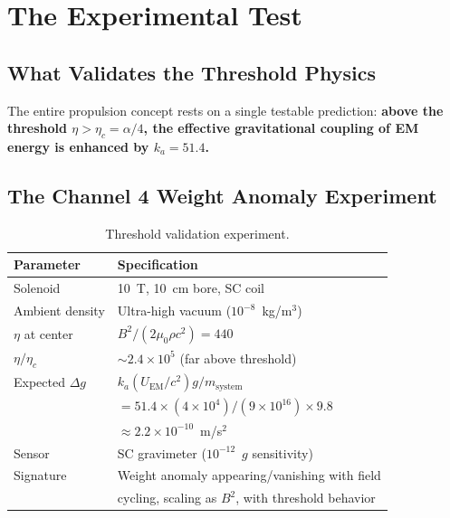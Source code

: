 \documentclass[12pt,aps,prd,superscriptaddress,nofootinbib,longbibliography]{revtex4-2}
\newcommand{\ka}{k_a}
\newcommand{\etac}{\eta_c}
\begin{document}
\section{The Experimental Test}\label{sec:experiment}

\subsection{What Validates the Threshold Physics}

The entire propulsion concept rests on a single testable prediction:
\textbf{above the threshold $\eta > \etac = \alpha/4$, the effective
gravitational coupling of EM energy is enhanced by $\ka = 51.4$.}

\subsection{The Channel 4 Weight Anomaly Experiment}

\begin{table}[h]
\caption{Threshold validation experiment.}
\begin{ruledtabular}
\begin{tabular}{ll}
Parameter & Specification \\
\hline
Solenoid & 10~T, 10~cm bore, SC coil \\
Ambient density & Ultra-high vacuum ($10^{-8}$~kg/m$^3$) \\
$\eta$ at center & $B^2/(2\mu_0 \rho c^2) = 440$ \\
$\eta/\etac$ & $\sim 2.4 \times 10^5$ (far above threshold) \\
Expected $\Delta g$ & $\ka (U_{\mathrm{EM}}/c^2) g / m_{\mathrm{system}}$ \\
& $= 51.4 \times (4 \times 10^4)/(9 \times 10^{16}) \times 9.8$ \\
& $\approx 2.2 \times 10^{-10}$~m/s$^2$ \\
Sensor & SC gravimeter ($10^{-12}$~$g$ sensitivity) \\
Signature & Weight anomaly appearing/vanishing with field \\
& cycling, scaling as $B^2$, with threshold behavior \\
\end{tabular}
\end{ruledtabular}
\end{table}
\end{document}
